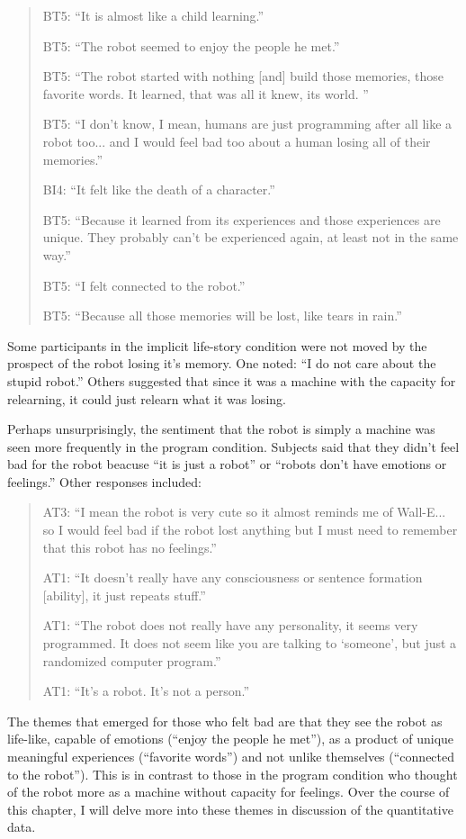 \begin{quotation}
BT5: ``It is almost like a child learning.''

BT5: ``The robot seemed to enjoy the people he met.''

BT5: ``The robot started with nothing [and] build those memories, those favorite words. It learned, that was all it knew, its world. ''

BT5: ``I don't know, I mean, humans are just programming after all like a robot too... and I would feel bad too about a human losing all of their memories.''

BI4: ``It felt like the death of a character.''

BT5: ``Because it learned from its experiences and those experiences are unique. They probably can't be experienced again, at least not in the same way.''

BT5: ``I felt connected to the robot.''

BT5: ``Because all those memories will be lost, like tears in rain.''
\end{quotation}

Some participants in the implicit life-story condition were not moved by the prospect of the robot losing it's memory. One noted: ``I do not care about the stupid robot.'' Others suggested that since it was a machine with the capacity for relearning, it could just relearn what it was losing.

Perhaps unsurprisingly, the sentiment that the robot is simply a machine was seen more frequently in the program condition. Subjects said that they didn't feel bad for the robot beacuse ``it is just a robot'' or ``robots don't have emotions or feelings.'' Other responses included:

\begin{quotation}
AT3: ``I mean the robot is very cute so it almost reminds me of Wall-E... so I would feel bad if the robot lost anything but I must need to remember that this robot has no feelings.''

AT1: ``It doesn't really have any consciousness or sentence formation [ability], it just repeats stuff.''

AT1: ``The robot does not really have any personality, it seems very programmed. It does not seem like you are talking to \lq someone\rq, but just a randomized computer program.''

AT1: ``It's a robot. It's not a person.''
\end{quotation}


The themes that emerged for those who felt bad are that they see the robot as life-like, capable of emotions (``enjoy the people he met''), as a product of unique meaningful experiences (``favorite words'') and not unlike themselves (``connected to the robot''). This is in contrast to those in the program condition who thought of the robot more as a machine without capacity for feelings. Over the course of this chapter, I will delve more into these themes in discussion of the quantitative data.

